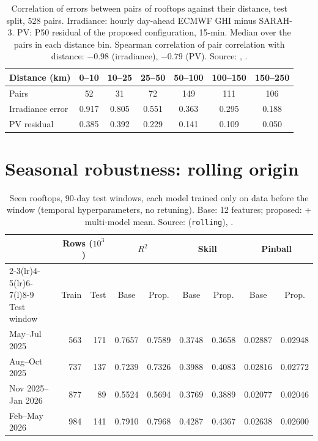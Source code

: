 \begin{table}[H]
\centering
\caption{Correlation of errors between pairs of rooftops against their distance, test split, 528 pairs. Irradiance: hourly day-ahead ECMWF GHI minus SARAH-3. PV: P50 residual of the proposed configuration, 15-min. Median over the pairs in each distance bin. Spearman correlation of pair correlation with distance: $-0.98$ (irradiance), $-0.79$ (PV). Source: , .}
\label{tab:s-distance}
\small
\begin{tabular}{@{}l c c c c c c@{}}
\toprule
Distance (km) & 0--10 & 10--25 & 25--50 & 50--100 & 100--150 & 150--250 \\
\midrule
Pairs & 52 & 31 & 72 & 149 & 111 & 106 \\
Irradiance error & 0.917 & 0.805 & 0.551 & 0.363 & 0.295 & 0.188 \\
PV residual & 0.385 & 0.392 & 0.229 & 0.141 & 0.109 & 0.050 \\
\bottomrule
\end{tabular}
\end{table}

\section{Seasonal robustness: rolling origin}
\label{sec:s-rolling}

\begin{table}[H]
\centering
\caption{Seen rooftops, 90-day test windows, each model trained only on data before the window (temporal hyperparameters, no retuning). Base: 12 features; proposed: + multi-model mean. Source:  (\texttt{rolling}), .}
\label{tab:s-rolling}
\footnotesize
\setlength{\tabcolsep}{4pt}
\begin{tabular}{@{}l r r c c c c c c@{}}
\toprule
 & \multicolumn{2}{c}{Rows ($10^3$)} & \multicolumn{2}{c}{$R^2$} & \multicolumn{2}{c}{Skill} & \multicolumn{2}{c}{Pinball} \\
\cmidrule(lr){2-3}\cmidrule(lr){4-5}\cmidrule(lr){6-7}\cmidrule(l){8-9}
Test window & Train & Test & Base & Prop. & Base & Prop. & Base & Prop. \\
\midrule
May--Jul 2025 & 563 & 171 & 0.7657 & 0.7589 & 0.3748 & 0.3658 & 0.02887 & 0.02948 \\
Aug--Oct 2025 & 737 & 137 & 0.7239 & 0.7326 & 0.3988 & 0.4083 & 0.02816 & 0.02772 \\
Nov 2025--Jan 2026 & 877 & 89 & 0.5524 & 0.5694 & 0.3769 & 0.3889 & 0.02077 & 0.02046 \\
Feb--May 2026 & 984 & 141 & 0.7910 & 0.7968 & 0.4287 & 0.4367 & 0.02638 & 0.02600 \\
\bottomrule
\end{tabular}
\end{table}

